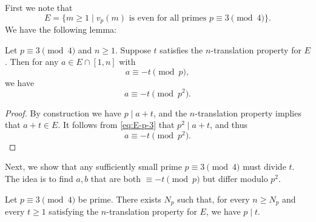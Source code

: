 \documentclass{amsart}
\begin{document}
First we note that 
\begin{equation}\label{eq:E-p-3}
    E = \{m \geq 1 \mid v_p(m) \text{ is even for all primes } p \equiv 3 \pmod 4\}.
\end{equation}
We have the following lemma:
\begin{lemma}\label{lem:1}
    Let $p \equiv 3 \pmod 4$ and $n \geq 1$. Suppose $t$ satisfies the $n$-translation property for $E$. Then for any $a\in E \cap [1,n]$ with
    \begin{equation*}
        a \equiv  -t \pmod p,
    \end{equation*}
    we have
    \begin{equation*}
        a \equiv -t \pmod{p^2}.
    \end{equation*}
\end{lemma}
\begin{proof}
    By construction we have $p \mid a + t$, and the $n$-translation property implies that $a + t \in E$. It follows from \eqref{eq:E-p-3} that $p^2 \mid a + t$, and thus
    \begin{equation*}
        a  \equiv -t \pmod{p^2}.
    \end{equation*}
\end{proof}

Next, we show that any sufficiently small prime $p \equiv 3 \pmod 4$ must divide $t$. The idea is to find $a,b$ that are both $\equiv -t \pmod p$ but differ modulo $p^2$.
\begin{lemma}\label{lem:2}
   Let $p \equiv 3 \pmod 4$ be prime. There exists $N_p$ such that,
   for every $n \geq N_p$ and every $t \geq 1$ satisfying the $n$-translation property for $E$, we have $p \mid t$.
\end{lemma}
\end{document}
